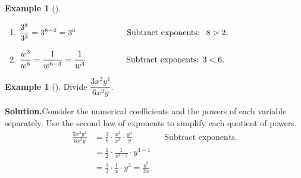 \documentclass[10pt,]{book}
\theoremstyle{plain}
\theoremstyle{definition}
\theoremstyle{definition}
\newtheorem{example}[theorem]{Example}
\theoremstyle{definition}
\numberwithin{equation}{part}
\newcommand{\lt}{<}
\newcommand{\gt}{>}
\newcommand{\amp}{&}
\begin{document}
\begin{example}[]\label{example-35}
\leavevmode%
\begin{enumerate}
\item\hypertarget{li-193}{}\(\dfrac{3^8}{3^2}=3^{8-2}=3^6\hphantom{blankblankbla}\text{Subtract exponents: }~8 \gt 2.\)%
\item\hypertarget{li-194}{}\(\displaystyle{\frac{w^3}{w^6}=\frac{1}{w^{6-3}}=\frac{1}{w^3}\hphantom{blankblank}\text{Subtract exponents: }3\lt 6.}\)%
\end{enumerate}
%
\end{example}
\begin{example}[]\label{example-36}
Divide \(\dfrac{3x^2 y^4}{6x^3 y}.\)%
\par\medskip\noindent%
\textbf{Solution.}\quad Consider the numerical coefficients and the powers of each variable separately. Use the second law of exponents to simplify each quotient of powers.%
\begin{align*}
\frac{3x^2 y^4}{6x^3 y} \amp = \frac{3}{6}\cdot \frac{x^2}{x^3} \cdot \frac{y^4}{y}\amp\amp\text{Subtract exponents.}
\\
\amp = \frac{1}{2}\cdot \frac{1}{x^{3-2}} \cdot y^{4-1}\\
\amp = \frac{1}{2}\cdot \frac{1}{x} \cdot y^3=\frac{y^3}{2x}
\end{align*}
%
\end{example}
\typeout{************************************************}
\typeout{************************************************}
\end{document}
